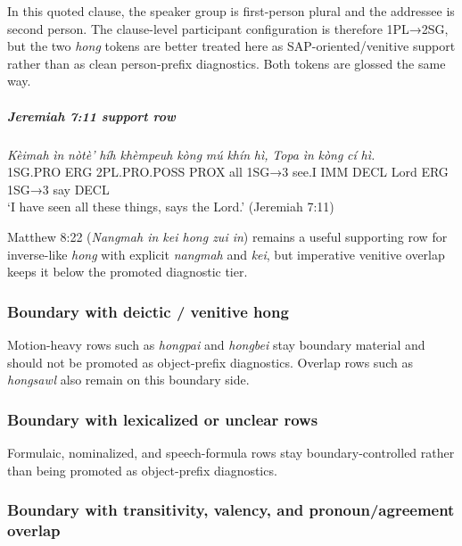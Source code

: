 \documentclass[
  11pt,
  a4paper,
]{article}
\newcommand{\tdim}[1]{\textit{#1}}
\newcommand{\tdimword}[1]{\textit{#1}}
\renewcommand{\textsc}[1]{{\footnotesize\MakeUppercase{#1}}}
\newcommand{\glossquote}[1]{`#1'}
\begin{document}
In this quoted clause, the speaker group is first-person plural and the
addressee is second person. The clause-level participant configuration
is therefore 1PL→2SG, but the two \tdim{hong} tokens are better treated
here as SAP-oriented/venitive support rather than as clean person-prefix
diagnostics. Both tokens are glossed the same way.

\subparagraph{Jeremiah 7:11 support row}\label{jeremiah-711-support-row}

\begin{exe}
\ex \label{ex:hk-support-jer7}
\gll \tdimword{Kèimah} \tdimword{ìn} \tdimword{nòtè'} \tdimword{híh} \tdimword{khèmpeuh} \tdimword{kòng} \tdimword{mú} \tdimword{khín} \tdimword{hì,} \tdimword{Topa} \tdimword{ìn} \tdimword{kòng} \tdimword{cí} \tdimword{hì.} \\
     \textsc{1sg}.\textsc{pro} \textsc{erg} \textsc{2pl}.\textsc{pro}.\textsc{poss} \textsc{prox} all \textsc{1sg→3} see.\textsc{i} \textsc{imm} \textsc{decl} Lord \textsc{erg} \textsc{1sg→3} say \textsc{decl} \\
\glt \glossquote{I have seen all these things, says the Lord.} (Jeremiah 7:11)
\end{exe}

Matthew 8:22 (\tdim{Nangmah in kei hong zui in}) remains a useful
supporting row for inverse-like \tdim{hong} with explicit \tdim{nangmah}
and \tdim{kei}, but imperative venitive overlap keeps it below the
promoted diagnostic tier.

\subsubsection{Boundary with deictic / venitive
hong}\label{boundary-with-deictic-venitive-hong}

Motion-heavy rows such as \tdim{hongpai} and \tdim{hongbei} stay
boundary material and should not be promoted as object-prefix
diagnostics. Overlap rows such as \tdim{hongsawl} also remain on this
boundary side.

\subsubsection{Boundary with lexicalized or unclear
rows}\label{boundary-with-lexicalized-or-unclear-rows}

Formulaic, nominalized, and speech-formula rows stay boundary-controlled
rather than being promoted as object-prefix diagnostics.

\subsubsection{Boundary with transitivity, valency, and
pronoun/agreement
overlap}\label{boundary-with-transitivity-valency-and-pronounagreement-overlap}
\end{document}
